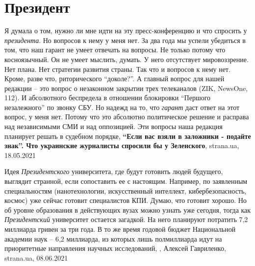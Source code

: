  
 
 
 
 
\chapter{Президент}
\label{sec:slova.prezident}

Я думала о том, нужно ли мне идти на эту пресс-конференцию и что спросить у
\emph{президента}. Но вопросов к нему у меня нет. За два года мы успели убедиться в
том, что наш гарант не умеет отвечать на вопросы. Не только потому что
косноязычный. Он не умеет мыслить, думать. У него отсутствует мировоззрение.
Нет плана. Нет стратегии развития страны. Так что и вопросов к нему нет. Кроме,
разве что, риторического \enquote{доколе?}.  А главный вопрос для нашей
редакции – это вопрос о незаконном закрытии трех телеканалов (ZIK, NewsOne,
112). И абсолютного беспредела в отношении блокировки \enquote{Першого
незалежного} по звонку СБУ. Но надежд на то, что \emph{гарант} даст ответ на этот
вопрос, у меня нет. Потому что это абсолютно политическое решение и расправа
над независимыми СМИ и над оппозицией. Эти вопросы наша редакция планирует
решать в судебном порядке,
\textbf{\enquote{Если вас взяли в заложники - подайте знак}. Что украинские журналисты спросили бы у Зеленского},
strana.ua, 18.05.2021

Идея \emph{Президентского} университета, где будут готовить людей будущего,
выглядит странной, если сопоставить ее с настоящим. Например, по заявленным
специальностям (нанотехнологии, искусственный интеллект, кибербезопасность,
космос) уже сейчас готовит специалистов КПИ. Думаю, что готовит хорошо. Но об
уровне образования в действующих вузах можно узнать уже сегодня, тогда как
\emph{Президентский} университет остается загадкой.  На него планируют
потратить 7,2 миллиарда гривен за три года. В то же время годовой бюджет
Национальной академии наук – 6,2 миллиарда, из которых лишь полмиллиарда идут
на приоритетные направления научных исследований,
, Алексей Гавриленко, strana.ua, 08.06.2021

